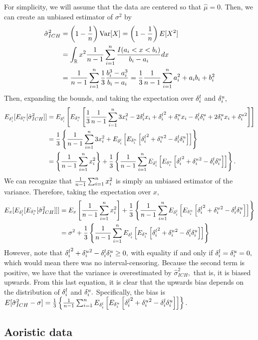 For simplicity, we will assume that the data are centered so that $\hat\mu = 0.$ Then, we can create an unbiased estimator of $\sigma^2$ by
\begin{align}
\hat{\sigma}^2_{ICH} &= \left(1 - \frac{1}{n} \right) \text{Var}[X] = \left(1 - \frac{1}{n} \right) E[X^2] \\
&= \int_{\mathbb{R}} x^2 \frac{1}{n - 1}\sum_{i=1}^n \frac{I(a_i < x < b_i)}{b_i - a_i} dx \\
&= \frac{1}{n - 1}\sum_{i=1}^n \frac{1}{3} \frac{b_i^3 - a_i^3}{b_i - a_i}
= \frac{1}{3} \frac{1}{n - 1}\sum_{i=1}^n a_i^2 + a_i b_i + b_i^2
\end{align}
Then, expanding the bounds, and taking the expectation over ${\delta^l_i}$ and ${\delta^u_i},$
\begin{align}
E_{\delta^l_i} [E_{\delta^u_i} [\hat{\sigma}^2_{ICH}]] &=  E_{\delta^l_i} \left[ E_{\delta^u_i} \left[ \frac{1}{3} \frac{1}{n - 1}\sum_{i=1}^n 3 x_i^2 - 2{\delta^l_i} x_i + {\delta^l_i}^2 + {\delta^u_i} x_i - {\delta^l_i} {\delta^u_i} + 2 {\delta^u_i} x_i + {\delta^u_i}^2 \right] \right] \\
 &= \frac{1}{3} \left\{ \frac{1}{n - 1}\sum_{i=1}^n 3 x_i^2 +  E_{\delta^l_i} \left[ E_{\delta^u_i} \left[ {\delta^l_i}^2 + {\delta^u_i}^2 - {\delta^l_i} {\delta^u_i} \right] \right]  \right\} \\
 &= \left\{ \frac{1}{n - 1}\sum_{i=1}^n x_i^2  \right\}   + \frac{1}{3} \left\{ \frac{1}{n - 1}\sum_{i=1}^n E_{\delta^l_i} \left[ E_{\delta^u_i} \left[ {\delta^l_i}^2 + {\delta^u_i}^2 - {\delta^l_i}{\delta^u_i} \right] \right] \right\}.
\end{align}
We can recognize that $\frac{1}{n - 1}\sum_{i=1}^n{x_i^2}$ is simply an unbiased estimator of the variance. Therefore, taking the expectation over $x$,
\begin{align}
E_x[E_{\delta^l_i} [E_{\delta^u_i} [\hat{\sigma}^2_{ICH}]]] &= E_x\left[ \frac{1}{n - 1}\sum_{i=1}^n x_i^2 \right] +  \frac{1}{3}\left\{ \frac{1}{n - 1}\sum_{i=1}^n E_{\delta^l_i} \left[ E_{\delta^u_i} \left[ {\delta^l_i}^2 + {\delta^u_i}^2 - {\delta^l_i}{\delta^u_i} \right]\right] \right\} \\
&= \sigma^2 +  \frac{1}{3}\left\{ \frac{1}{n - 1}\sum_{i=1}^n E_{\delta^l_i} \left[ E_{\delta^u_i} \left[ {\delta^l_i}^2 + {\delta^u_i}^2 - {\delta^l_i}{\delta^u_i} \right] \right] \right\}
\end{align}
However, note that  ${\delta^l_i}^2 + {\delta^u_i}^2 - {\delta^l_i}{\delta^u_i} \geq 0,$ with equality if and only if ${\delta^l_i} = {\delta^u_i} = 0,$ which would mean there was no interval-censoring. Because the second term is positive, we have that the variance is overestimated by $\hat{\sigma}^2_{ICH},$ that is, it is biased upwards. From this last equation, it is clear that the upwards bias depends on the distribution of ${\delta^l_i}$ and ${\delta^u_i}.$ Specifically, the bias is $E[\hat{\sigma}^2_{ICH} - \sigma] =   \frac{1}{3}\left\{ \frac{1}{n - 1}\sum_{i=1}^n E_{\delta^l_i} \left[ E_{\delta^u_i} \left[ {\delta^l_i}^2 + {\delta^u_i}^2 - {\delta^l_i}{\delta^u_i} \right]\right] \right\}.$

\subsection{Aoristic data} \label{aoproof}

